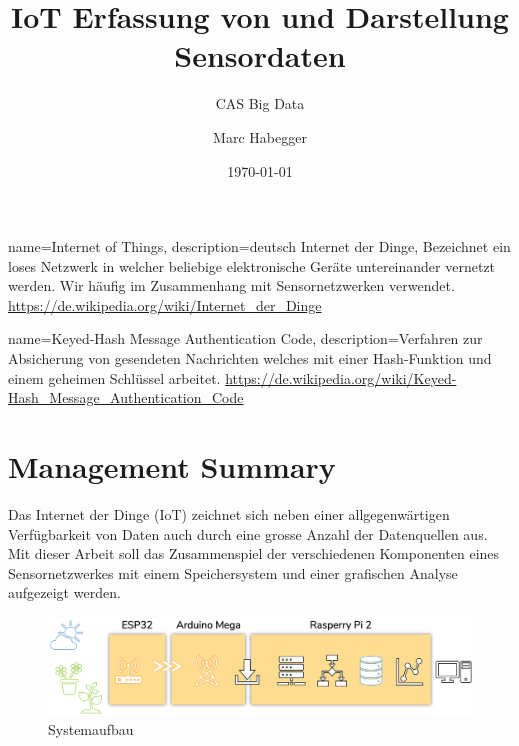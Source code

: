 \documentclass[
  10pt, %
  a4paper, %
  twoside, %
  openright, %
  numbers=noenddot, %
  BCOR=5mm, %
  parskip=half*, %
  thesis, %
]{bfhbook}
\author{Marc Habegger}
\title{IoT Erfassung von und Darstellung Sensordaten}
\subtitle{CAS Big Data}
\date{\today} %
\begin{document}
 
{
    name=Internet of Things,
    description={deutsch Internet der Dinge, Bezeichnet ein loses Netzwerk in welcher beliebige elektronische Geräte untereinander vernetzt werden. Wir häufig im Zusammenhang mit Sensornetzwerken verwendet.\break 
    \url{https://de.wikipedia.org/wiki/Internet_der_Dinge}}
}

{
    name=Keyed-Hash Message Authentication Code,
    description={Verfahren zur Absicherung von gesendeten Nachrichten welches mit einer Hash-Funktion und einem geheimen Schlüssel arbeitet.\break
    \url{https://de.wikipedia.org/wiki/Keyed-Hash_Message_Authentication_Code}}
}

\maketitle
\frontmatter %

\tableofcontents
\sloppy
\mainmatter %
\chapter*{Management Summary}

Das Internet der Dinge (\Gls{IoT}) zeichnet sich neben einer allgegenwärtigen Verfügbarkeit von Daten auch durch eine grosse Anzahl der Datenquellen aus. Mit dieser Arbeit soll das Zusammenspiel der verschiedenen Komponenten eines Sensornetzwerkes mit einem Speichersystem und einer grafischen Analyse aufgezeigt werden.

\begin{figure}[htp]
  \begin{center}
    \includegraphics[width=18cm, left]{Bilder/Overview.png}
  \end{center}
    \caption{Systemaufbau}
\end{figure}
\end{document}
